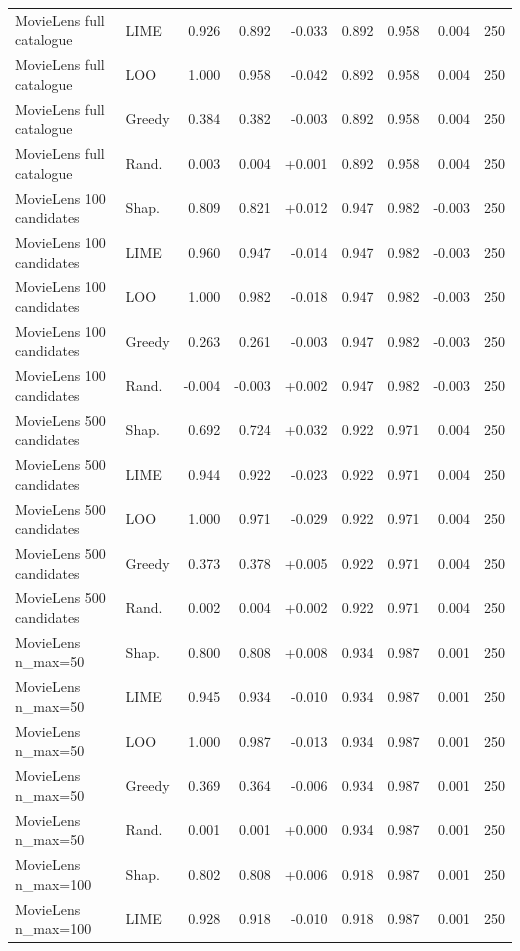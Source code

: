 \begin{table}[!htbp]
\begin{tabular}{@{}llrrrrrrr@{}}
MovieLens full catalogue & LIME & 0.926 & 0.892 & -0.033 & 0.892 & 0.958 & 0.004 & 250 \\
MovieLens full catalogue & LOO & 1.000 & 0.958 & -0.042 & 0.892 & 0.958 & 0.004 & 250 \\
MovieLens full catalogue & Greedy & 0.384 & 0.382 & -0.003 & 0.892 & 0.958 & 0.004 & 250 \\
MovieLens full catalogue & Rand. & 0.003 & 0.004 & +0.001 & 0.892 & 0.958 & 0.004 & 250 \\
MovieLens 100 candidates & Shap. & 0.809 & 0.821 & +0.012 & 0.947 & 0.982 & -0.003 & 250 \\
MovieLens 100 candidates & LIME & 0.960 & 0.947 & -0.014 & 0.947 & 0.982 & -0.003 & 250 \\
MovieLens 100 candidates & LOO & 1.000 & 0.982 & -0.018 & 0.947 & 0.982 & -0.003 & 250 \\
MovieLens 100 candidates & Greedy & 0.263 & 0.261 & -0.003 & 0.947 & 0.982 & -0.003 & 250 \\
MovieLens 100 candidates & Rand. & -0.004 & -0.003 & +0.002 & 0.947 & 0.982 & -0.003 & 250 \\
MovieLens 500 candidates & Shap. & 0.692 & 0.724 & +0.032 & 0.922 & 0.971 & 0.004 & 250 \\
MovieLens 500 candidates & LIME & 0.944 & 0.922 & -0.023 & 0.922 & 0.971 & 0.004 & 250 \\
MovieLens 500 candidates & LOO & 1.000 & 0.971 & -0.029 & 0.922 & 0.971 & 0.004 & 250 \\
MovieLens 500 candidates & Greedy & 0.373 & 0.378 & +0.005 & 0.922 & 0.971 & 0.004 & 250 \\
MovieLens 500 candidates & Rand. & 0.002 & 0.004 & +0.002 & 0.922 & 0.971 & 0.004 & 250 \\
MovieLens n\_max=50 & Shap. & 0.800 & 0.808 & +0.008 & 0.934 & 0.987 & 0.001 & 250 \\
MovieLens n\_max=50 & LIME & 0.945 & 0.934 & -0.010 & 0.934 & 0.987 & 0.001 & 250 \\
MovieLens n\_max=50 & LOO & 1.000 & 0.987 & -0.013 & 0.934 & 0.987 & 0.001 & 250 \\
MovieLens n\_max=50 & Greedy & 0.369 & 0.364 & -0.006 & 0.934 & 0.987 & 0.001 & 250 \\
MovieLens n\_max=50 & Rand. & 0.001 & 0.001 & +0.000 & 0.934 & 0.987 & 0.001 & 250 \\
MovieLens n\_max=100 & Shap. & 0.802 & 0.808 & +0.006 & 0.918 & 0.987 & 0.001 & 250 \\
MovieLens n\_max=100 & LIME & 0.928 & 0.918 & -0.010 & 0.918 & 0.987 & 0.001 & 250 \\

\end{tabular}
\end{table}
